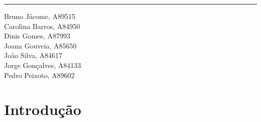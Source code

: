 \documentclass[12pt, a4paper, oneside]{scrreport}
\begin{document}
\begin{center}
\rule{\textwidth}{0.5pt}
\end{center}
\begin{multicols*}{2}
\noindent
\large Bruno Jácome, A89515\\
  Carolina Barros, A84950\\
  Dinis Gomes, A87993\\
  Joana Gouveia, A85650\columnbreak
  \\João Silva, A84617\\
  Jorge Gonçalves, A84133\\
  Pedro Peixoto, A89602
\end{multicols*}


\renewcommand*\contentsname{Índice}
\tableofcontents

\renewcommand{\listfigurename}{Lista de Ilustrações}
\listoffigures

\renewcommand{\listtablename}{Tabelas}
\listoftables

\newpage

\setlength{\leftmargini}{-0,35cm}
\setlength{\leftmarginii}{-0,35cm}

\renewcommand{\chaptermark}[1]{\markboth{#1}{}}
\ofoot*{\color{gray} \leftmark\hspace{0.25cm}|\hspace{0.25cm}\thepage}


\renewcommand{\abstractname}{Sumário} 


\chapter{Introdução}

\end{document}
